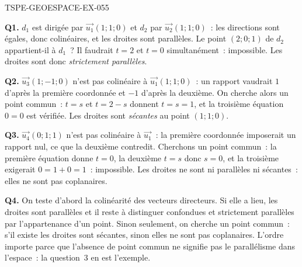 \begin{corrige}{TSPE-GEOESPACE-EX-055}

\textbf{Q1.} $d_1$ est dirigée par $\vec{u_1}(1;1;0)$ et $d_2$ par
$\vec{u_2}(1;1;0)$~: les directions sont égales, donc colinéaires, et les
droites sont parallèles. Le point $(2;0;1)$ de $d_2$ appartient-il à $d_1$~?
Il faudrait $t=2$ et $t=0$ simultanément~: impossible. Les droites sont donc
\emph{strictement parallèles}.

\textbf{Q2.} $\vec{u_3}(1;-1;0)$ n'est pas colinéaire à $\vec{u_1}(1;1;0)$~:
un rapport vaudrait $1$ d'après la première coordonnée et $-1$ d'après la
deuxième. On cherche alors un point commun~: $t=s$ et $t=2-s$ donnent
$t=s=1$, et la troisième équation $0=0$ est vérifiée. Les droites sont
\emph{sécantes} au point $(1;1;0)$.

\textbf{Q3.} $\vec{u_4}(0;1;1)$ n'est pas colinéaire à $\vec{u_1}$~: la
première coordonnée imposerait un rapport nul, ce que la deuxième contredit.
Cherchons un point commun~: la première équation donne $t=0$, la deuxième
$t=s$ donc $s=0$, et la troisième exigerait $0=1+0=1$~: impossible. Les
droites ne sont ni parallèles ni sécantes~: elles ne sont pas coplanaires.

\textbf{Q4.} On teste d'abord la colinéarité des vecteurs directeurs. Si elle
a lieu, les droites sont parallèles et il reste à distinguer confondues et
strictement parallèles par l'appartenance d'un point. Sinon seulement, on
cherche un point commun~: s'il existe les droites sont sécantes, sinon elles
ne sont pas coplanaires. L'ordre importe parce que l'absence de point commun
ne signifie pas le parallélisme dans l'espace~: la question~3 en est
l'exemple.

\end{corrige}

%
%
%
